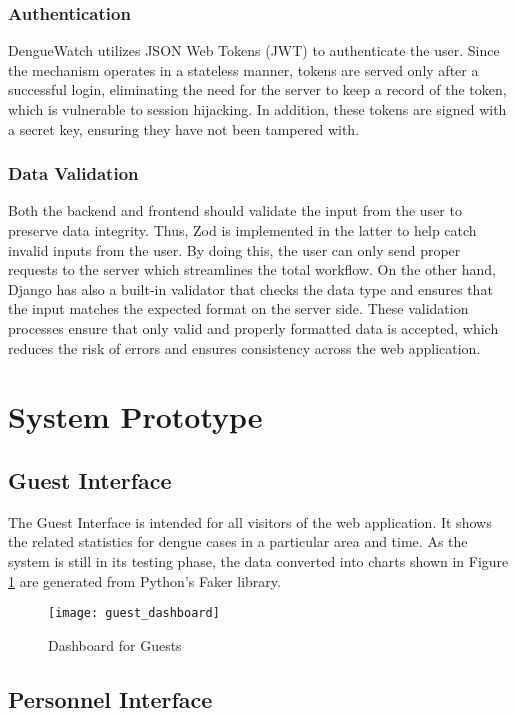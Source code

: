 \subsubsection{Authentication}
DengueWatch utilizes JSON Web Tokens (JWT) to authenticate the user. Since the mechanism operates in a stateless manner, tokens are served only after a successful login, eliminating the need for the server to keep a record of the token, which is vulnerable to session hijacking. In addition, these tokens are signed with a secret key, ensuring they have not been tampered with. 

\subsubsection{Data Validation}
Both the backend and frontend should validate the input from the user to preserve data integrity. Thus, Zod is implemented in the latter to help catch invalid inputs from the user. By doing this, the user can only send proper requests to the server which streamlines the total workflow. On the other hand, Django has also a built-in validator that checks the data type and ensures that the input matches the expected format on the server side. These validation processes ensure that only valid and properly formatted data is accepted, which reduces the risk of errors and ensures consistency across the web application. 

\section{System Prototype}
\subsection{Guest Interface}
The Guest Interface is intended for all visitors of the web application. It shows the related statistics for dengue cases in a particular area and time. As the system is still in its testing phase, the data converted into charts shown in Figure \ref{fig:guest_dashboard} are generated from Python's Faker library. 
\begin{figure}[H]
	\centering
	\texttt{[image: guest\_dashboard]}
	\caption{Dashboard for Guests}
	\label{fig:guest_dashboard}
\end{figure}
\subsection{Personnel Interface}
